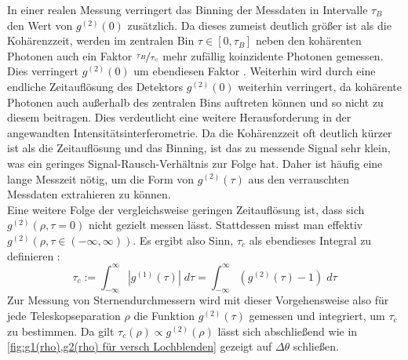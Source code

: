 In einer realen Messung verringert das Binning der Messdaten in Intervalle $\tau_B$ den Wert von $g^{(2)}(0)$ zusätzlich. 
Da dieses zumeist deutlich größer ist als die Kohärenzzeit, werden im zentralen Bin $\tau \in [0, \tau_B]$ neben den kohärenten Photonen auch ein Faktor $\nicefrac{\tau_B}{\tau_c}$ mehr zufällig koinzidente Photonen gemessen. 
Dies verringert $g^{(2)}(0)$ um ebendiesen Faktor \cite[Kap. 14.7]{mandelOpticalCoherenceQuantum1995}. 
Weiterhin wird durch eine endliche Zeitauflösung des Detektors $g^{(2)}(0)$ weiterhin verringert, da kohärente Photonen auch außerhalb des zentralen Bins auftreten können und so nicht zu diesem beitragen. 
Dies verdeutlicht eine weitere Herausforderung in der angewandten Intensitätsinterferometrie. 
Da die Kohärenzzeit oft deutlich kürzer ist als die Zeitauflösung und das Binning, ist das zu messende Signal sehr klein, was ein geringes Signal-Rausch-Verhältnis zur Folge hat. 
Daher ist häufig eine lange Messzeit nötig, um die Form von $g^{(2)}(\tau)$ aus den verrauschten Messdaten extrahieren zu können. \\
Eine weitere Folge der vergleichsweise geringen Zeitauflösung ist, dass sich $g^{(2)}(\rho, \tau=0)$ nicht gezielt messen lässt. 
Stattdessen misst man effektiv $g^{(2)}(\rho, \tau\in(-\infty, \infty))$. 
Es ergibt also Sinn, $\tau_c$ als ebendieses Integral zu definieren \cite[Eq. 14.7-2]{mandelOpticalCoherenceQuantum1995}: 
\begin{equation}
    \tau_c := \int_{-\infty}^{\infty} \left|g^{(1)}(\tau) \right|\;d\tau = \int_{-\infty}^{\infty} \left(g^{(2)}(\tau) - 1\right)\;d\tau
\end{equation}
Zur Messung von Sternendurchmessern wird mit dieser Vorgehensweise also für jede Teleskopseparation $\rho$ die Funktion $g^{(2)}(\tau)$ gemessen und integriert, um $\tau_c$ zu bestimmen. 
Da gilt $\tau_c(\rho)\propto g^{(2)}(\rho)$ lässt sich abschließend wie in \autoref{fig:g1(rho),g2(rho) für versch Lochblenden} gezeigt auf $\Delta\theta$ schließen. \\

